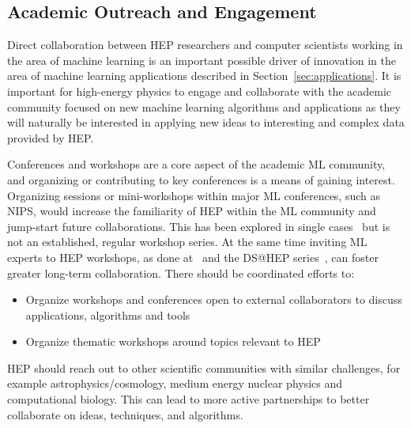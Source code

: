 \subsection{Academic Outreach and Engagement}

Direct collaboration between HEP researchers and computer scientists working in the area of machine learning is an important possible driver of innovation in the area of machine learning applications described in Section~\ref{sec:applications}.
It is important for high-energy physics to engage and collaborate with the academic community focused on new machine learning algorithms and applications as they will naturally be interested in applying new ideas to interesting and complex data provided by HEP.

Conferences and workshops are a core aspect of the academic ML community, and organizing or contributing to key conferences is a means of gaining interest.
Organizing sessions or mini-workshops within major ML conferences, such as NIPS, would increase the familiarity of HEP within the ML community and jump-start future collaborations.
This has been explored in single cases~\cite{NIPS:2015:ALEPH} but is not an established, regular workshop series.
At the same time inviting ML experts to HEP workshops, as done at~\cite{FlavourDataMining} and the DS@HEP series~\cite{DSatHEP2015, DSatHEP2016, DSatHEP2017}, can foster greater long-term collaboration.
There should be coordinated efforts to:
\begin{itemize}
 \item Organize workshops and conferences open to external collaborators to discuss applications, algorithms and tools
 \item Organize thematic workshops around topics relevant to HEP
\end{itemize}

HEP should reach out to other scientific communities with similar challenges, for example astrophysics/cosmology, medium energy nuclear physics and computational biology. This can lead to more active partnerships to better collaborate on ideas, techniques, and algorithms.


